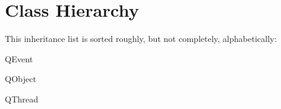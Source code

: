 \section{Class Hierarchy}
This inheritance list is sorted roughly, but not completely, alphabetically\-:\begin{DoxyCompactList}
\item {}
\item Q\-Event\begin{DoxyCompactList}
\item {}
\end{DoxyCompactList}
\item Q\-Object\begin{DoxyCompactList}
\item {}
\item {}
\end{DoxyCompactList}
\item Q\-Thread\begin{DoxyCompactList}
\item {}
\end{DoxyCompactList}
\end{DoxyCompactList}
